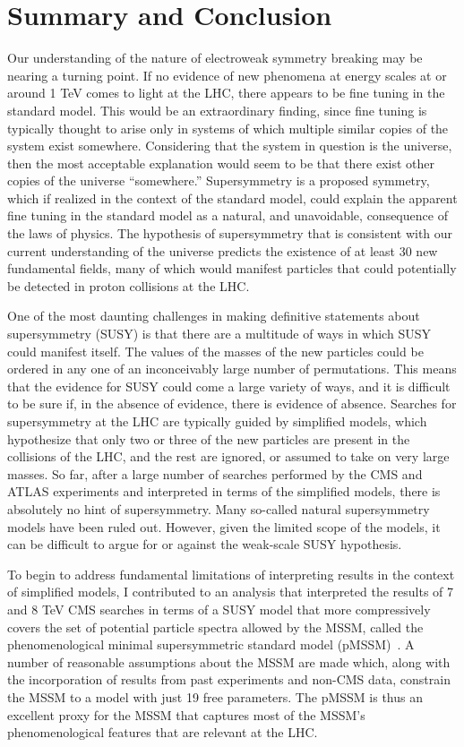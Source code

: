 \FloatBarrier
\chapter{Summary and Conclusion}
Our understanding of the nature of electroweak symmetry breaking may be nearing a turning point. If no evidence of new phenomena at energy scales at or around 1 TeV comes to light at the LHC, there appears to be fine tuning in the standard model. This would be an extraordinary finding, since fine tuning is typically thought to arise only in systems of which multiple similar copies of the system exist somewhere. Considering that the system in question is the universe, then the most acceptable explanation would seem to be that there exist other copies of the universe ``somewhere.'' Supersymmetry is a proposed symmetry, which if realized in the context of the standard model, could explain the apparent fine tuning in the standard model as a natural, and unavoidable, consequence of the laws of physics. The hypothesis of supersymmetry that is consistent with our current understanding of the universe predicts the existence of at least 30 new fundamental fields, many of which would manifest particles that could potentially be detected in proton collisions at the LHC. 

One of the most daunting challenges in making definitive statements about supersymmetry (SUSY) is that there are a multitude of ways in which SUSY could manifest itself. The values of the masses of the new particles could be ordered in any one of an inconceivably large number of permutations. This means that the evidence for SUSY could come a large variety of ways, and it is difficult to be sure if, in the absence of evidence, there is evidence of absence. Searches for supersymmetry at the LHC are typically guided by simplified models, which hypothesize that only two or three of the new particles are present in the collisions of the LHC, and the rest are ignored, or assumed to take on very large masses. So far, after a large number of searches performed by the CMS and ATLAS experiments and interpreted in terms of the simplified models, there is absolutely no hint of supersymmetry. Many so-called natural supersymmetry models have been ruled out. However, given the limited scope of the models, it can be difficult to argue for or against the weak-scale SUSY hypothesis.

To begin to address fundamental limitations of interpreting results in the context of simplified models, I contributed to an analysis that interpreted the results of 7 and 8 TeV CMS searches in terms of a SUSY model that more compressively covers the set of potential particle spectra allowed by the MSSM, called the phenomenological minimal supersymmetric standard model (pMSSM)~\cite{Khachatryan:2016nvf}. A number of reasonable assumptions about the MSSM are made which, along with the incorporation of results from past experiments and non-CMS data, constrain the MSSM to a model with just 19 free parameters. The pMSSM is thus an excellent proxy for the MSSM that captures most of the MSSM's phenomenological features that are relevant at the LHC. 


